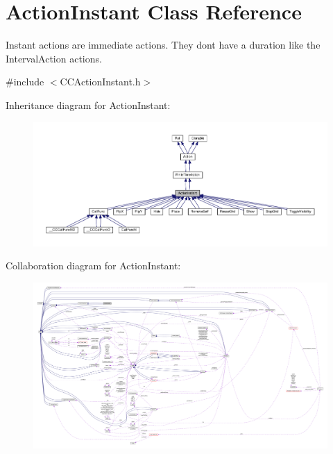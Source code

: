 \hypertarget{classActionInstant}{}\section{Action\+Instant Class Reference}
\label{classActionInstant}


Instant actions are immediate actions. They don\textquotesingle{}t have a duration like the Interval\+Action actions.  




{\ttfamily \#include $<$C\+C\+Action\+Instant.\+h$>$}



Inheritance diagram for Action\+Instant\+:
\nopagebreak
\begin{figure}[H]
\begin{center}
\leavevmode
\includegraphics[width=350pt]{classActionInstant__inherit__graph}
\end{center}
\end{figure}


Collaboration diagram for Action\+Instant\+:
\nopagebreak
\begin{figure}[H]
\begin{center}
\leavevmode
\includegraphics[width=350pt]{classActionInstant__coll__graph}
\end{center}
\end{figure}
